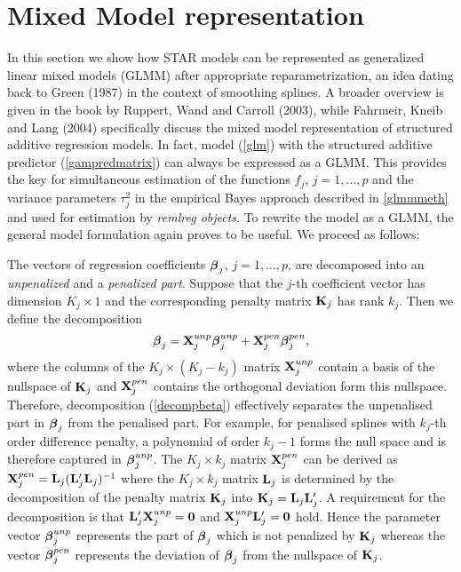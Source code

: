 \documentclass[11pt,a4paper,twoside]{bayesxarticle}
\begin{document}
\section{Mixed Model representation}
\label{glmmrep}

In this section we show how STAR models can be represented as
generalized linear mixed models (GLMM) after appropriate
reparametrization, an idea dating back to Green (1987) in the
context of smoothing splines. A broader overview is given in the
book by Ruppert, Wand and Carroll (2003), while Fahrmeir, Kneib and
Lang (2004) specifically discuss the mixed model representation of
structured additive regression models. In fact, model (\ref{glm})
with the structured additive predictor (\ref{gampredmatrix}) can
always be expressed as a GLMM. This provides the key for
simultaneous estimation of the functions $f_j$, $j=1,\dots,p$ and
the variance parameters $\tau^2_j$ in the empirical Bayes approach
described in \autoref{glmmmeth} and used for estimation by {\em
remlreg objects}. To rewrite the model as a GLMM, the general model
formulation again proves to be useful. We proceed as follows:

The  vectors of regression coefficients $\boldsymbol{\beta}_j$, $j=1,\dots,p$,
are decomposed into an {\em unpenalized} and a {\em penalized part}.
Suppose that the $j$-th coefficient vector has dimension $K_j \times
1$ and the corresponding penalty matrix $\mathbf{K}_j$ has rank $k_j$. Then
we define the decomposition
\begin{equation}\label{decompbeta}
 \betavec_j = \Xvec_j^{unp} \betavec_j^{unp} + \Xvec_j^{pen}\betavec_j^{pen},
\end{equation}
where the columns of the $K_j \times (K_j - k_j)$ matrix
$\mathbf{X}_j^{unp}$ contain a basis of the nullspace of $\mathbf{K}_j$ and
$\mathbf{X}_j^{pen}$ contains the orthogonal deviation form this
nullspace. Therefore, decomposition (\ref{decompbeta}) effectively
separates the unpenalised part in $\boldsymbol{\beta}_j$ from the penalised
part. For example, for penalised splines with $k_j$-th order
difference penalty, a polynomial of order $k_j-1$ forms the null
space and is therefore captured in $\boldsymbol{\beta}_j^{unp}$. The  $K_j
\times k_j$ matrix $\mathbf{X}_j^{pen}$ can be derived as $\mathbf{X}_j^{pen}
= \mathbf{L}_j(\mathbf{L}_j'\mathbf{L}_j)^{-1}$ where the $K_j \times k_j$ matrix
$\mathbf{L}_j$ is determined by the decomposition of the penalty matrix
$\mathbf{K}_j$ into $\mathbf{K}_j = \mathbf{L}_j \mathbf{L}_j'$. A requirement for the
decomposition is that $\mathbf{L}_j' \mathbf{X}_j^{unp} = \boldsymbol{0}$ and
$\mathbf{X}_j^{unp} \mathbf{L}_j' = \boldsymbol{0}$ hold. Hence the parameter vector
$\boldsymbol{\beta}_j^{unp}$ represents the part of $\boldsymbol{\beta}_j$ which is not
penalized by $\mathbf{K}_j$ whereas the vector $\boldsymbol{\beta}_j^{pen}$
represents the deviation of $\boldsymbol{\beta}_j$ from the nullspace of
$\mathbf{K}_j$.
\end{document}
